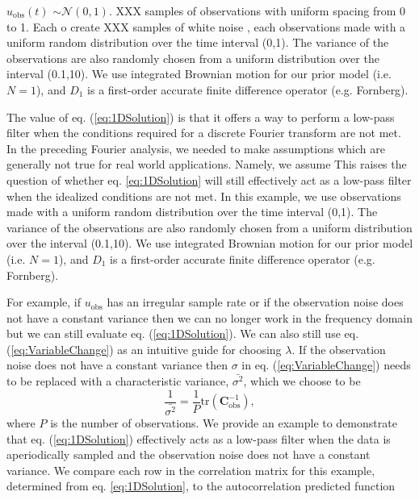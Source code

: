 \documentclass[10pt,a4paper]{article}
\begin{document}
 $u_\mathrm{obs}(t)$  $\sim \mathcal{N}(0,1)$.  XXX samples of observations with uniform spacing from 0 to 1.  Each o      create XXX samples of white noise , each   observations made with a uniform random distribution over the time interval (0,1).  The variance of the observations are also randomly chosen from a uniform distribution over the interval (0.1,10).  We use integrated Brownian motion for our prior model (i.e. $N=1$), and $D_1$ is a first-order accurate finite difference operator (e.g. Fornberg).

The value of eq. (\ref{eq:1DSolution}) is that it offers a way to perform a low-pass filter when the conditions required for a discrete Fourier transform are not met.  In the preceding Fourier analysis, we needed to make assumptions which are generally not true for real world applications.  Namely, we assume  This raises the question of whether eq. \ref{eq:1DSolution} will still effectively act as a low-pass filter when the idealized conditions are not met.  In this example, we use  observations made with a uniform random distribution over the time interval (0,1).  The variance of the observations are also randomly chosen from a uniform distribution over the interval (0.1,10).  We use integrated Brownian motion for our prior model (i.e. $N=1$), and $D_1$ is a first-order accurate finite difference operator (e.g. Fornberg).

  For example, if $u_\mathrm{obs}$ has an irregular sample rate or if the observation noise does not have a constant variance then we can no longer work in the frequency domain but we can still evaluate eq. (\ref{eq:1DSolution}).  We can also still use eq. (\ref{eq:VariableChange}) as an intuitive guide for choosing $\lambda$.  If the  observation noise does not have a constant variance then $\sigma$ in eq. (\ref{eq:VariableChange}) needs to be replaced with a characteristic variance, $\bar{\sigma^2}$, which we choose to be
\begin{equation}\label{eq:CharacteristicVariance}
\frac{1}{\bar{\sigma^2}} = \frac{1}{P} \mathrm{tr}\left(\mathbf{C}_\mathrm{obs}^{-1}\right),
\end{equation}
where $P$ is the number of observations.  We provide an example to demonstrate that eq. (\ref{eq:1DSolution}) effectively acts as a low-pass filter when the data is aperiodically sampled and the observation noise does not have a constant variance.    We compare each row in the correlation matrix for this example, determined from eq. \ref{eq:1DSolution}, to the autocorrelation predicted function       
\end{document}
